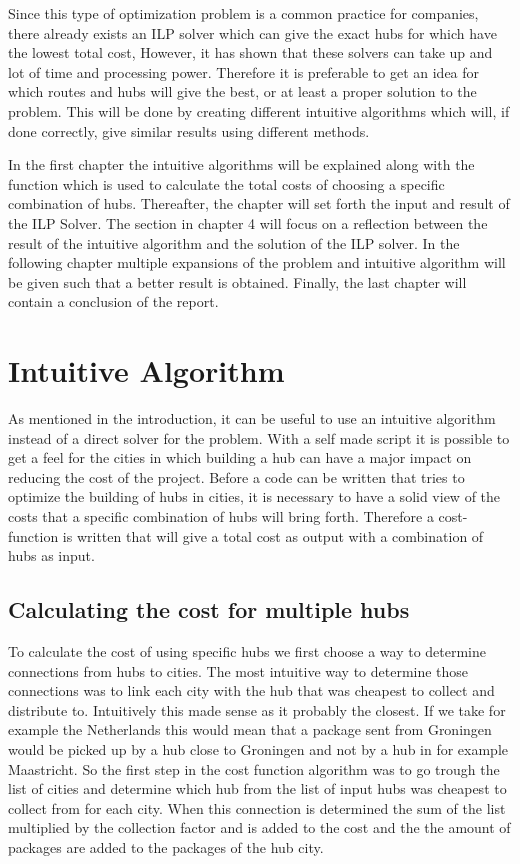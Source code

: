 \documentclass{article}
\begin{document}
Since this type of optimization problem is a common practice for companies, there already exists an ILP solver which can give the exact hubs for which have the lowest total cost, However, it has shown that these solvers can take up and lot of time and processing power. Therefore it is preferable to get an idea for which routes and hubs will give the best, or at least a proper solution to the problem. This will be done by creating different intuitive algorithms which will, if done correctly, give similar results using different methods.

In the first chapter the intuitive algorithms will be explained along with the function which is used to calculate the total costs of choosing a specific combination of hubs. Thereafter, the chapter will set forth the input and result of the ILP Solver. The section in chapter 4 will focus on a reflection between the result of the intuitive algorithm and the solution of the ILP solver. In the following chapter multiple expansions of the problem and intuitive algorithm will be given such that a better result is obtained. Finally, the last chapter will contain a conclusion of the report.






\newpage
\section{Intuitive Algorithm}
\label{Inuitive algorithms}
As mentioned in the introduction, it can be useful to use an intuitive algorithm instead of a direct solver for the problem. With a self made script it is possible to get a feel for the cities in which building a hub can have a major impact on reducing the cost of the project. 
Before a code can be written that tries to optimize the building of hubs in cities, it is necessary to have a solid view of the costs that a specific combination of hubs will bring forth. Therefore a cost-function is written that will give a total cost as output with a combination of hubs as input. 



    \subsection{Calculating the cost for multiple hubs}
        To calculate the cost of using specific hubs we first choose a way to determine connections from hubs to cities. The most intuitive way to determine those connections was to link each city with the hub that was cheapest to collect and distribute to. Intuitively this made sense as it probably the closest. If we take for example the Netherlands this would mean that a package sent from Groningen would be picked up by a hub close to Groningen and not by a hub in for example Maastricht. So the first step in the cost function algorithm was to go trough the list of cities and determine which hub from the list of input hubs was cheapest to collect from for each city. When this connection is determined the sum of the list multiplied by the collection factor and is added to the cost and the the amount of packages are added to the packages of the hub city. %
        
\end{document}
